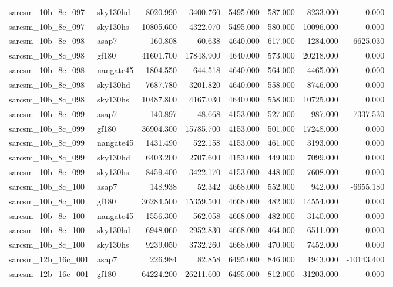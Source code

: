\begin{tabular}{llrrrrrr}
sarcsm\_10b\_8c\_097 & sky130hd & 8020.990 & 3400.760 & 5495.000 & 587.000 & 8233.000 & 0.000 \\
sarcsm\_10b\_8c\_097 & sky130hs & 10805.600 & 4322.070 & 5495.000 & 580.000 & 10096.000 & 0.000 \\
sarcsm\_10b\_8c\_098 & asap7 & 160.808 & 60.638 & 4640.000 & 617.000 & 1284.000 & -6625.030 \\
sarcsm\_10b\_8c\_098 & gf180 & 41601.700 & 17848.900 & 4640.000 & 573.000 & 20218.000 & 0.000 \\
sarcsm\_10b\_8c\_098 & nangate45 & 1804.550 & 644.518 & 4640.000 & 564.000 & 4465.000 & 0.000 \\
sarcsm\_10b\_8c\_098 & sky130hd & 7687.780 & 3201.820 & 4640.000 & 558.000 & 8746.000 & 0.000 \\
sarcsm\_10b\_8c\_098 & sky130hs & 10487.800 & 4167.030 & 4640.000 & 558.000 & 10725.000 & 0.000 \\
sarcsm\_10b\_8c\_099 & asap7 & 140.897 & 48.668 & 4153.000 & 527.000 & 987.000 & -7337.530 \\
sarcsm\_10b\_8c\_099 & gf180 & 36904.300 & 15785.700 & 4153.000 & 501.000 & 17248.000 & 0.000 \\
sarcsm\_10b\_8c\_099 & nangate45 & 1431.490 & 522.158 & 4153.000 & 461.000 & 3193.000 & 0.000 \\
sarcsm\_10b\_8c\_099 & sky130hd & 6403.200 & 2707.600 & 4153.000 & 449.000 & 7099.000 & 0.000 \\
sarcsm\_10b\_8c\_099 & sky130hs & 8459.400 & 3422.170 & 4153.000 & 448.000 & 7608.000 & 0.000 \\
sarcsm\_10b\_8c\_100 & asap7 & 148.938 & 52.342 & 4668.000 & 552.000 & 942.000 & -6655.180 \\
sarcsm\_10b\_8c\_100 & gf180 & 36284.500 & 15359.500 & 4668.000 & 482.000 & 14554.000 & 0.000 \\
sarcsm\_10b\_8c\_100 & nangate45 & 1556.300 & 562.058 & 4668.000 & 482.000 & 3140.000 & 0.000 \\
sarcsm\_10b\_8c\_100 & sky130hd & 6948.060 & 2952.830 & 4668.000 & 464.000 & 6511.000 & 0.000 \\
sarcsm\_10b\_8c\_100 & sky130hs & 9239.050 & 3732.260 & 4668.000 & 470.000 & 7452.000 & 0.000 \\
sarcsm\_12b\_16c\_001 & asap7 & 226.984 & 82.858 & 6495.000 & 846.000 & 1943.000 & -10143.400 \\
sarcsm\_12b\_16c\_001 & gf180 & 64224.200 & 26211.600 & 6495.000 & 812.000 & 31203.000 & 0.000 \\

\end{tabular}
